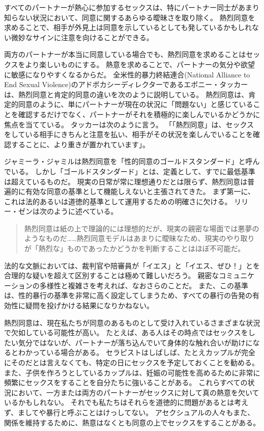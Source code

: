 \documentclass[paper=a4,book,openany]{jlreq}
\newcommand{\ig}[1]{}           %
\begin{document}
すべてのパートナーが熱心に参加するセックスは、特にパートナー同士があまり知らない状況において、同意に関するあらゆる曖昧さを取り除く。
熱烈同意を求めることで、相手が外見上は同意を示しているとしても発しているかもしれない微妙なサインに注意を向けることができる。

両方のパートナーが本当に同意している場合でも、熱烈同意を求めることはセックスをより楽しいものにする。
熱意を求めることで、パートナーの気分や欲望に敏感になりやすくなるからだ。
全米性的暴力終結連合(National Alliance to End Sexual Violence)のアドボカシーディレクターであるエボニー・タッカー\ig{Ebony Tucker}は、熱烈同意と肯定的同意の違いを次のように説明している。
熱烈同意は、肯定的同意のように、単にパートナーが現在の状況に「問題ない」と感じていることを確認するだけでなく、パートナーがそれを積極的に楽しんでいるかどうかに焦点を当てている。
タッカーは次のように言う。
「「熱烈同意」は、セックスをしている相手にきちんと注意を払い、相手がその状況を楽しんでいることを確認することに、より重きが置かれています」\citep{cooney18:_aziz_ansar_alleg_has_peopl}。

ジャミーラ・ジャミル\ig{Jameela Jamil}は熱烈同意を「性的同意のゴールドスタンダード」と呼んでいる\citep{jamil18:_what_we_need_learn_aziz_ansar_clust}。
しかし「ゴールドスタンダード」とは、定義として、すでに最低基準は超えているものだ。
現実の日常が常に理想通りだとは限らず、熱烈同意は普遍的に有効な同意の基準として機能しえないと主張されてきた。
まず第一に、これは法的あるいは道徳的基準として運用するための明確さに欠ける。
リリー・ゼン\ig{Lily Zheng}は次のように述べている。

\begin{quote}
熱烈同意は紙の上で理論的には理想的だが、現実の親密な場面では悪夢のようなものだ……熱烈同意モデルはあまりに曖昧なため、現実のやり取りが「熱烈な」ものであったかどうかを判断することはほぼ不可能だ。
\citep{zheng14:_how_ace_sex}

\end{quote}

法的な文脈においては、裁判官や陪審員が「イエス」と「イエス、ぜひ！」とを合理的な疑いを超えて区別することは極めて難しいだろう。
親密なコミュニケーションの多様性と複雑さを考えれば、なおさらのことだ。
また、この基準は、性的暴行の基準を非常に高く設定してしまうため、すべての暴行の告発の有効性に疑問を投げかける結果になりかねない。

熱烈同意は、現在私たちが同意のあるものとして受け入れているさまざまな状況で欠如している可能性が高い。
たとえば、ある人はその時点ではセックスをしたい気分ではないが、パートナーが落ち込んでいて身体的な触れ合いが助けになるとわかっている場合がある。
セラピストはしばしば、たとえカップルが完全にそのだとは言えなくても、特定の日にセックスを予定しておくことを勧める。
また、子供を作ろうとしているカップルは、妊娠の可能性を高めるために非常に頻繁にセックスをすることを自分たちに強いることがある。
これらすべての状況において、一方または両方のパートナーがセックスに対して真の熱意を欠いているかもしれない。
それでも私たちはそれらを道徳的に問題があるとは考えず、ましてや暴行と呼ぶことはけっしてない。
アセクシュアルの人々もまた、関係を維持するために、熱意はなくとも同意の上でセックスをすることがある。
\end{document}
